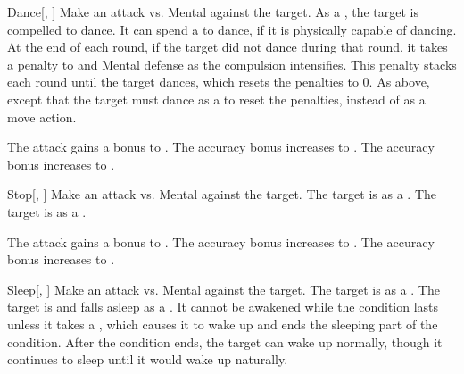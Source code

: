 \lowercase{\hypertarget{spell:Dance}{}}\label{spell:Dance}
\begin{freeability}[Rank 1]{\hypertarget{spell:Dance}{Dance}}[, ]
Make an attack vs. Mental against the target.
\hit As a , the target is compelled to dance.
It can spend a  to dance, if it is physically capable of dancing.
At the end of each round, if the target did not dance during that round, it takes a  penalty to  and Mental defense as the compulsion intensifies.
This penalty stacks each round until the target dances, which resets the penalties to 0.
\crit As above, except that the target must dance as a  to reset the penalties, instead of as a move action.

\rankline
{} The attack gains a  bonus to .
 The accuracy bonus increases to .
 The accuracy bonus increases to .
\end{freeability}
\vspace{0.25em}



\lowercase{\hypertarget{spell:Stop}{}}\label{spell:Stop}
\begin{freeability}[Rank 1]{\hypertarget{spell:Stop}{Stop}}[, ]
Make an attack vs. Mental against the target.
\hit The target is  as a .
\crit The target is  as a .

\rankline
{} The attack gains a  bonus to .
 The accuracy bonus increases to .
 The accuracy bonus increases to .
\end{freeability}
\vspace{0.25em}



\lowercase{\hypertarget{spell:Sleep}{}}\label{spell:Sleep}
\begin{freeability}[Rank 4]{\hypertarget{spell:Sleep}{Sleep}}[, ]
Make an attack vs. Mental against the target.
\hit The target is  as a .
\crit The target is  and falls asleep as a .
It cannot be awakened while the condition lasts unless it takes a , which causes it to wake up and ends the sleeping part of the condition.
After the condition ends, the target can wake up normally, though it continues to sleep until it would wake up naturally.
\end{freeability}
\vspace{0.25em}



